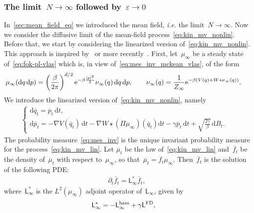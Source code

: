 \documentclass[onefignum,onetabnum]{siamart251216} %
\renewcommand{\d}{\mathrm{d}}
\newcommand{\ee}{{\rm e}}
\newcommand{\mescin}{\mu}
\newcommand{\mespos}{\nu}
\newcommand{\projp}{\Pi}
\newcommand{\adj}{\mathsf{L}_\infty^*}
\newcommand{\genlin}{\mathsf{L}_\infty}
\newcommand{\Lham}{\mathsf{L}^{\rm{ham}}}
\newcommand{\LFD}{\mathsf{L}^{\rm{FD}}}
\newcommand{\eps}{\varepsilon}
\theoremstyle{plain}
\numberwithin{equation}{section}
\numberwithin{theorem}{section}
\begin{document}
\subsubsection{The limit~\texorpdfstring{$N \rightarrow \infty$}{N to infinity} followed by~\texorpdfstring{$\eps\rightarrow 0$}{eps to 0}}
\label{sec:N_inf_then_eps_0}
In~\cref{sec:mean_field_eq} we introduced the mean field, \textit{i.e.} the limit~$N \to \infty$. Now we consider the diffusive limit of the mean-field process~\eqref{eq:kin_mv_nonlin}. Before that, we start by considering the linearized version of~\eqref{eq:kin_mv_nonlin}. This approach is inspired by~\cite{addala20212} or more recently~\cite{pavliotis2025linearizationergodicmckeansdes}.
First, let~$\mescin_\infty$ be a steady state of~\eqref{eq:fok-pl-vlas} which is, in view of~\eqref{eq:mes_inv_mckean_vlas}, of the form
\begin{align}
    \label{eq:mes_inv}
    \mescin_\infty(\d q\,\d p)
    &= \left(\frac{\beta}{2\pi}\right)^{d/2} \ee^{-\beta \frac{|p|^2}{2}}\mespos_\infty(q)\,\d q\,\d p, \qquad \mespos_\infty(q)= \frac{1}{Z_\infty}\ee^{-\beta(V(q)+W*\mespos_\infty(q))}.
\end{align}
We introduce the linearized version of~\eqref{eq:kin_mv_nonlin}, namely
\begin{align}
    \label{eq:kin_mv_lin}
    \left\{
\begin{array}{ll}
    \d \overline q_t = \displaystyle \overline p_t \,\d t  , & \\
    \d \overline p_t = \displaystyle -\nabla V(\overline q_t) \,\d t - \nabla W \star \left( \projp \mescin_\infty \right) (\overline q_t)\d t -\gamma \overline p_t \,\d t +\sqrt{\frac{2\gamma}{\beta}}\,\d B_t.&
\end{array}
    \right.
\end{align}
The probability measure~\eqref{eq:mes_inv} is the unique invariant probability measure for the process~\eqref{eq:kin_mv_lin}.
Let $\overline{\mescin}_t$ be the law of~\eqref{eq:kin_mv_lin} and~$\overline{f}_t$ be the density of~$\overline{\mescin}_t$ with respect to~$\mescin_\infty$, so that~$\overline{\mescin}_t = \overline{f}_t \mescin_\infty$.
Then~$\overline{f}_t$ is the solution of the following PDE:
\begin{align}
    \label{eq:linearized_adjoint_eq}
    \partial_t \overline{f}_t =  \adj \overline{f}_t,
\end{align}
where~$\adj$ is the $L^2(\mescin_\infty)$ adjoint operator of~$\genlin$, given by
\begin{align}
    \label{eq:generator_lin}
    \adj &= -\Lham_\infty + \gamma\LFD,
\end{align}
\end{document}
